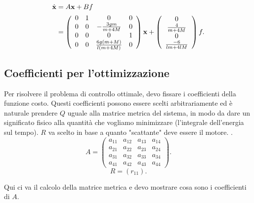 \begin{equation*}
    \begin{aligned}
        \dot {\mathbf{x}} &= A\mathbf{x} + Bf \\
        &= \left(\begin{array}{cccc}0&1&0&0\\0&0&-\frac{3gm}{m+4M}&0\\0&0&0&1\\0&0&\frac{6g(m+M)}{l(m+4M)}&0\\\end{array}\right) \mathbf{x} + \left(\begin{array}{c}0\\\frac{4}{m+4M}\\0\\\frac{-6}{lm+4lM}\end{array}\right)f.
    \end{aligned}
\end{equation*}

\subsection{Coefficienti per l'ottimizzazione}
Per risolvere il problema di controllo ottimale, devo fissare i coefficienti della funzione costo.
Questi coefficienti possono essere scelti arbitrariamente ed è naturale prendere $Q$ uguale alla matrice metrica del sistema, in modo da dare un significato fisico alla quantità che vogliamo minimizzare (l'integrale dell'energia sul tempo). $R$ va scelto in base a quanto "scattante" deve essere il motore. .
\begin{equation*}
    A = \left(
    \begin{array}{cccc}
        a_{11} & a_{12} & a_{13} & a_{14} \\
        a_{21} & a_{22} & a_{23} & a_{24} \\
        a_{31} & a_{32} & a_{33} & a_{34} \\
        a_{41} & a_{42} & a_{43} & a_{44}
    \end{array}
    \right).
\end{equation*}
\begin{equation*}
    R = \left(
    r_{11}
    \right).
\end{equation*}

Qui ci va il calcolo della matrice metrica e devo mostrare cosa sono i coefficienti di $A$.


